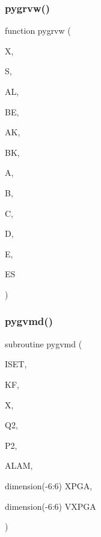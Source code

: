 \subsubsection{\texorpdfstring{pygrvw()}{pygrvw()}}
{\footnotesize\ttfamily function pygrvw (\begin{DoxyParamCaption}\item[{}]{X,  }\item[{}]{S,  }\item[{}]{AL,  }\item[{}]{BE,  }\item[{}]{AK,  }\item[{}]{BK,  }\item[{}]{A,  }\item[{}]{B,  }\item[{}]{C,  }\item[{}]{D,  }\item[{}]{E,  }\item[{}]{ES }\end{DoxyParamCaption})}

\mbox{\label{pythia-6_84_824_8f_a6b802d62748ef3052e945d88179ab875}} 
\subsubsection{\texorpdfstring{pygvmd()}{pygvmd()}}
{\footnotesize\ttfamily subroutine pygvmd (\begin{DoxyParamCaption}\item[{}]{I\+S\+ET,  }\item[{}]{KF,  }\item[{}]{X,  }\item[{}]{Q2,  }\item[{}]{P2,  }\item[{}]{A\+L\+AM,  }\item[{dimension(-\/6\+:6)}]{X\+P\+GA,  }\item[{dimension(-\/6\+:6)}]{V\+X\+P\+GA }\end{DoxyParamCaption})}

\mbox{\label{pythia-6_84_824_8f_a77dc3ade154146159f6da8352bc4edf6}} 
